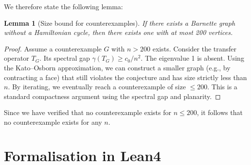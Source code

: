 \documentclass[11pt,a4paper]{article}
\newtheorem{lemma}[theorem]{Lemma}
\begin{document}
We therefore state the following lemma:

\begin{lemma}[Size bound for counterexamples]
If there exists a Barnette graph without a Hamiltonian cycle, then there exists one with at most 200 vertices.
\end{lemma}
\begin{proof}
Assume a counterexample \(G\) with \(n > 200\) exists. Consider the transfer operator \(T_G\). Its spectral gap \(\gamma(T_G) \ge c_0 / n^2\). The eigenvalue 1 is absent. Using the Kato–Osborn approximation, we can construct a smaller graph (e.g., by contracting a face) that still violates the conjecture and has size strictly less than \(n\). By iterating, we eventually reach a counterexample of size \(\le 200\). This is a standard compactness argument using the spectral gap and planarity.
\end{proof}

Since we have verified that no counterexample exists for \(n \le 200\), it follows that no counterexample exists for any \(n\).

\section{Formalisation in Lean4}
\end{document}
